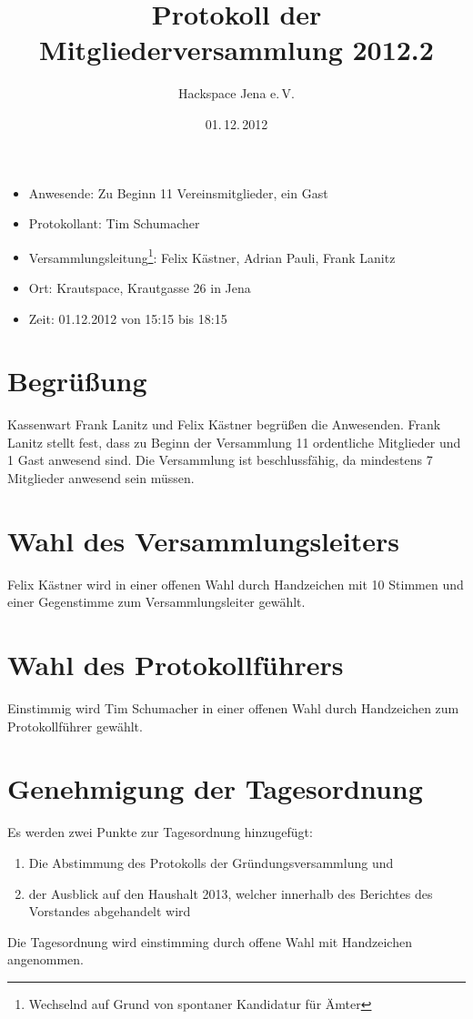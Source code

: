 \documentclass{scrartcl}
\title{Protokoll der Mitgliederversammlung 2012.2}
\author{Hackspace Jena e.\,V.}
\date{01.\,12.\,2012}
\begin{document}
\maketitle{}


\begin{itemize}
\item Anwesende: Zu Beginn 11 Vereinsmitglieder, ein Gast
\item Protokollant: Tim Schumacher
\item Versammlungsleitung\footnote{Wechselnd auf Grund von spontaner
Kandidatur für Ämter}: Felix Kästner, Adrian Pauli, Frank Lanitz
\item Ort: Krautspace, Krautgasse 26 in Jena
\item Zeit: 01.12.2012 von 15:15 bis 18:15
\end{itemize}

\section{Begrüßung}
Kassenwart Frank Lanitz und Felix Kästner begrüßen die Anwesenden. Frank
Lanitz stellt fest, dass zu Beginn der Versammlung 11 ordentliche
Mitglieder und 1 Gast anwesend sind. Die Versammlung ist beschlussfähig,
da mindestens 7 Mitglieder anwesend sein müssen.

\section{Wahl des Versammlungsleiters}
Felix Kästner wird in einer offenen Wahl durch Handzeichen mit 10
Stimmen und einer Gegenstimme zum Versammlungsleiter gewählt.

\section{Wahl des Protokollführers}
Einstimmig wird Tim Schumacher in einer offenen Wahl durch Handzeichen
zum Protokollführer gewählt.

\section{Genehmigung der Tagesordnung}

Es werden zwei Punkte zur Tagesordnung hinzugefügt:
\begin{enumerate}
	\item Die Abstimmung des Protokolls der Gründungsversammlung und
	\item der Ausblick auf den Haushalt 2013, welcher innerhalb des
Berichtes des Vorstandes abgehandelt wird
\end{enumerate}
Die Tagesordnung wird einstimming durch offene Wahl mit Handzeichen
angenommen.
\end{document}
